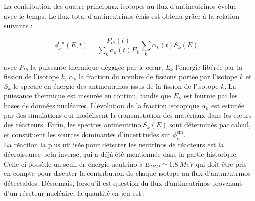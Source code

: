 La contribution des quatre principaux isotopes au flux d'antineutrinos évolue avec le temps. Le flux total d'antineutrinos émis est obtenu grâce à la relation suivante :

\begin{equation}
    \phi_\nu^\textrm{em}(E,t) = \frac{P_{th}(t)}{\sum_k \alpha_k (t) E_k} \sum_k \alpha_k (t) S_k(E),
\end{equation}

\bigbreak

avec $P_{th}$ la puissante thermique dégagée par le c\oe ur, $E_k$ l'énergie libérée par la fission de l'isotope $k$, $\alpha_k$ la fraction du nombre de fissions portée par l'isotope $k$ et $S_k$ le spectre en énergie des antineutrinos issus de la fission de l'isotope $k$. La puissance thermique est mesurée en continu, tandis que $E_k$ est fournie par les bases de données nucléaires. L'évolution de la fraction isotopique $\alpha_k$ est estimée par des simulations qui modélisent la transmutation des matériaux dans les c\oe urs des réacteurs. Enfin, les spectres antineutrino $S_k(E)$ sont déterminés par calcul, et constituent les sources dominantes d'incertitudes sur  $\phi_\nu^\textrm{em}$.\\

La réaction la plus utilisée pour détecter les neutrinos de réacteurs est la décroissance beta inverse, qui a déjà été mentionnée dans la partie historique. Celle-ci possède un seuil en énergie neutrino à $E_{IBD} \simeq \SI{1.8}{MeV}$ qui doit être pris en compte pour discuter la contribution de chaque isotope au flux d'antineutrinos détectables. Désormais, lorsqu'il est question du flux d'antineutrinos provenant d'un réacteur nucléaire, la quantité en jeu est :

